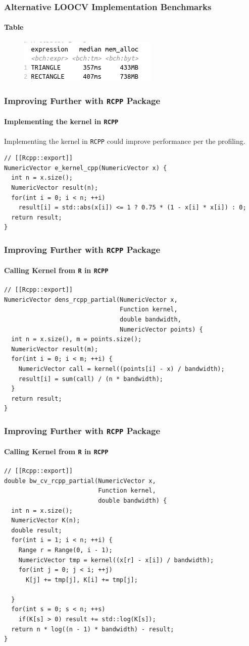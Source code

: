 \documentclass[aspectratio=169]{beamer}
\begin{document}
\begin{frame}
  \frametitle{Alternative LOOCV Implementation Benchmarks}
  \framesubtitle{Table}
  \begin{figure}
    \centering
    \includegraphics[scale = 0.7]{figure/TRIANGLE_RECTANGLE.png}
  \end{figure}
\end{frame}
\begin{frame}[fragile]
  \frametitle{Improving Further with \texttt{RCPP} Package} 
  \framesubtitle{Implementing the kernel in \texttt{RCPP}}
  Implementing the kernel in \texttt{RCPP} could improve performance per the profiling.\\
\begin{verbatim}
// [[Rcpp::export]]
NumericVector e_kernel_cpp(NumericVector x) {
  int n = x.size();
  NumericVector result(n);
  for(int i = 0; i < n; ++i)
    result[i] = std::abs(x[i]) <= 1 ? 0.75 * (1 - x[i] * x[i]) : 0;
  return result;
}
\end{verbatim}
\end{frame}
\begin{frame}[fragile]
  \frametitle{Improving Further with \texttt{RCPP} Package}
  \framesubtitle{Calling Kernel from \texttt{R} in \texttt{RCPP}} 
\begin{verbatim}
// [[Rcpp::export]]
NumericVector dens_rcpp_partial(NumericVector x,
                                Function kernel,
                                double bandwidth,
                                NumericVector points) {
  int n = x.size(), m = points.size();
  NumericVector result(m);
  for(int i = 0; i < m; ++i) {
    NumericVector call = kernel((points[i] - x) / bandwidth);
    result[i] = sum(call) / (n * bandwidth);
  }
  return result;
}
\end{verbatim}
\end{frame}
\begin{frame}[fragile]
  \frametitle{Improving Further with \texttt{RCPP} Package}
  \framesubtitle{Calling Kernel from \texttt{R} in \texttt{RCPP}}
\begin{verbatim}
// [[Rcpp::export]]
double bw_cv_rcpp_partial(NumericVector x,
                          Function kernel,
                          double bandwidth) {                          
  int n = x.size();
  NumericVector K(n);
  double result;
  for(int i = 1; i < n; ++i) {
    Range r = Range(0, i - 1);
    NumericVector tmp = kernel((x[r] - x[i]) / bandwidth);
    for(int j = 0; j < i; ++j)
      K[j] += tmp[j], K[i] += tmp[j];
      
  }
  for(int s = 0; s < n; ++s)
    if(K[s] > 0) result += std::log(K[s]);
  return n * log((n - 1) * bandwidth) - result;
}
\end{verbatim} 
\end{frame}
\end{document}
